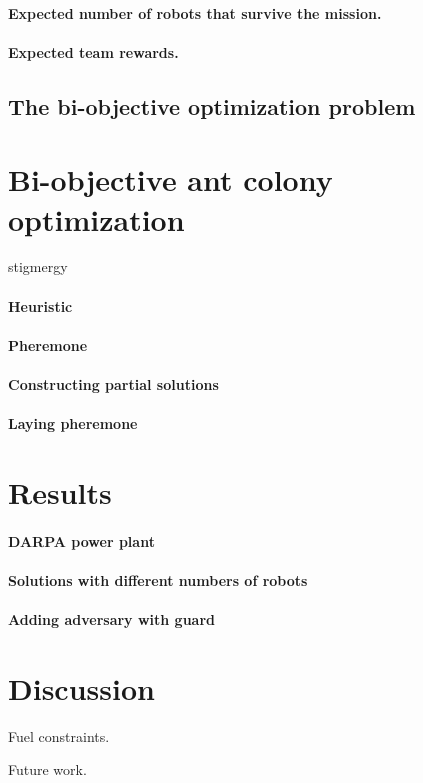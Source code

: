 \documentclass[11pt, oneside]{article}
\begin{document}
\paragraph{Expected number of robots that survive the mission.}

\paragraph{Expected team rewards.}

\subsection{The bi-objective optimization problem}

\section{Bi-objective ant colony optimization}
stigmergy

\paragraph{Heuristic}

\paragraph{Pheremone}

\paragraph{Constructing partial solutions}

\paragraph{Laying pheremone}

\section{Results}

\paragraph{DARPA power plant}

\paragraph{Solutions with different numbers of robots}

\paragraph{Adding adversary with guard}

\section{Discussion}

Fuel constraints.

Future work.




\end{document}
